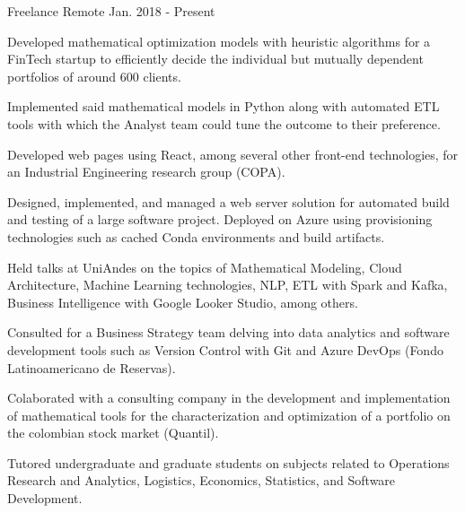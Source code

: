 

\begin{cventries}

	{Freelance} %
	{Remote} %
	{Jan. 2018 {-} Present} %
	{
		\begin{cvitems} %
			\item {Developed mathematical optimization models with heuristic algorithms for a FinTech startup to efficiently decide the individual but mutually dependent portfolios of around 600 clients.}
			\item {Implemented said mathematical models in Python along with automated ETL tools with which the Analyst team could tune the outcome to their preference.}
			\item {Developed web pages using React, among several other front-end technologies, for an Industrial Engineering research group (COPA).}
			\item {Designed, implemented, and managed a web server solution for automated build and testing of a large software project. Deployed on Azure using provisioning technologies such as cached Conda environments and build artifacts.}
			\item {Held talks at UniAndes on the topics of Mathematical Modeling, Cloud Architecture, Machine Learning technologies, NLP, ETL with Spark and Kafka, Business Intelligence with Google Looker Studio, among others.}
			\item {Consulted for a Business Strategy team delving into data analytics and software development tools such as Version Control with Git and Azure DevOps (Fondo Latinoamericano de Reservas).}
			\item {Colaborated with a consulting company in the development and implementation of mathematical tools for the characterization and optimization of a portfolio on the colombian stock market (Quantil).}
			\item {Tutored undergraduate and graduate students on subjects related to Operations Research and Analytics, Logistics, Economics, Statistics, and Software Development.}
		\end{cvitems}
	}


\end{cventries}
